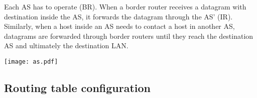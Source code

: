 Each AS has to operate  (BR). When a border router receives a datagram 
with destination inside the AS, it forwards the datagram through the AS'  (IR).
Similarly, when a host inside an AS needs to contact a host in another AS, datagrams are forwarded through border routers
until they reach the destination AS and ultimately the destination LAN.

\begin{center}
  \vspace{-0.2cm}
 \texttt{[image: as.pdf]}
 \vspace{-0.75cm}
\end{center}

\subsection{Routing table configuration}

